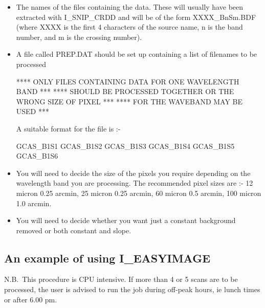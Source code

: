 \documentclass[nolof,noabs,11pt]{starlink}
\begin{document}
\begin {itemize}

\item The names of the files containing the data. These will usually have been
extracted with I\_SNIP\_CRDD and will be of the form XXXX\_BnSm.BDF
(where XXXX is the first 4 characters of the source name, n is the band
number, and m is the crossing number).

\item A file called PREP.DAT should be set up containing a list of filenames to
be processed

**** \hfill ONLY FILES CONTAINING DATA FOR ONE WAVELENGTH BAND \hfill****
\linebreak
**** \hfill SHOULD BE PROCESSED TOGETHER OR THE WRONG SIZE OF PIXEL \hfill****
\linebreak
**** \hfill FOR THE WAVEBAND MAY BE USED \hfill****

A suitable format for the file is :-

\begin{terminalv}
	GCAS_B1S1
	GCAS_B1S2
	GCAS_B1S3
	GCAS_B1S4
	GCAS_B1S5
	GCAS_B1S6
\end{terminalv}

\item You will need to decide the size of the pixels you require depending
on the wavelength band you are processing. The recommended pixel sizes are :-
12 micron  0.25 arcmin, 25 micron  0.25 arcmin, 60 micron   0.5 arcmin,
100 micron  1.0 arcmin.

\item You will need to decide whether you want just a constant background
removed or both constant and slope.

\end {itemize}

\pagebreak

\subsection{An example of using I\_EASYIMAGE}

N.B.\ This procedure is CPU intensive.
If more than 4 or 5 scans are to be processed, the user is advised to run the
job during off-peak hours, ie lunch times or after 6.00 pm.
\pagebreak
\end{document}
